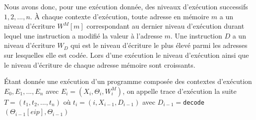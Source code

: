 \begin{center}
\end{center}


Nous avons donc, pour une exécution donnée, des niveaux d'exécution successifs $1, 2, ..., n$.
À chaque contexte d'exécution, toute adresse en mémoire $m$ a un niveau d'écriture $W^M[m]$ correspondant au dernier niveau d'exécution durant lequel une instruction a modifié la valeur à l'adresse $m$.
Une instruction $D$ a un niveau d'écriture $W_D$ qui est le niveau d'écriture le plus élevé parmi les adresses sur lesquelles elle est codée.
Lors d'une exécution le niveau d'exécution ainsi que le niveau d'écriture de chaque adresse mémoire sont croissants.




\begin{defi}
Étant donnée une exécution d'un programme composée des contextes d'exécution $E_0, E_1, ..., E_n$ avec $E_i=(X_i, \Theta_i, W_i^M)$, on appelle trace d'exécution la suite $T=(t_1, t_2, ..., t_n)$ où $t_i=(i, X_{i-1}, D_{i-1})$ avec $D_{i-1}=$\texttt{decode}$(\Theta_{i-1}[eip], \Theta_{i-1})$
\label{def:trace}
\end{defi}

